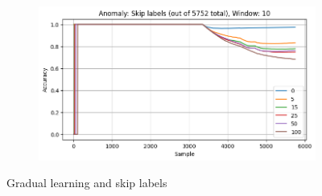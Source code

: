 \begin{figure}[ht]
\begin{subfigure}[b]{0.49\textwidth}
        \caption{}
    \end{subfigure}
    \hfill
    \begin{subfigure}[b]{0.49\textwidth}
        \includegraphics[width=\textwidth]{assets/design/gradual-learning-skip-spectral-domain-anomaly60.png}
        \caption{}
    \end{subfigure}
    \caption{Gradual learning and skip labels}
\end{figure}



